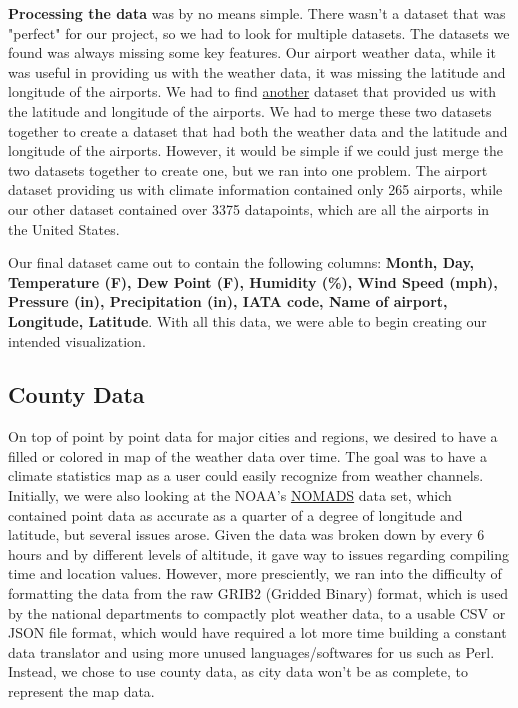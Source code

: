 \documentclass[9pt,twocolumn,twoside]{opticajnl}
\begin{document}
\textbf{Processing the data} was by no means simple. There wasn't a dataset that was "perfect" for our project, so we had to look for multiple datasets. The datasets we found was always missing some key features. Our airport weather data, while it was useful in providing us with the weather data, it was missing the latitude and longitude of the airports. We had to find \href{https://www.kaggle.com/datasets/nancyalaswad90/us-airports}{another} dataset that provided us with the latitude and longitude of the airports. We had to merge these two datasets together to create a dataset that had both the weather data and the latitude and longitude of the airports. However, it would be simple if we could just merge the two datasets together to create one, but we ran into one problem. The airport dataset providing us with climate information contained only 265 airports, while our other dataset contained over 3375 datapoints, which are all the airports in the United States.

Our final dataset came out to contain the following columns: \textbf{Month, Day, Temperature (F), Dew Point (F), Humidity (\%), Wind Speed (mph), Pressure (in), Precipitation (in), IATA code, Name of airport, Longitude, Latitude}. With all this data, we were able to begin creating our intended visualization.

\subsection{County Data}

On top of point by point data for major cities and regions, we desired to have a filled or colored in map of the weather data over time. The goal was to have a climate statistics map as a user could easily recognize from weather channels. Initially, we were also looking at the NOAA's \href{https://nomads.ncep.noaa.gov/}{NOMADS} data set, which contained point data as accurate as a quarter of a degree of longitude and latitude, but several issues arose. Given the data was broken down by every 6 hours and by different levels of altitude, it gave way to issues regarding compiling time and location values. However, more presciently, we ran into the difficulty of formatting the data from the raw GRIB2 (Gridded Binary) format, which is used by the national departments to compactly plot weather data, to a usable CSV or JSON file format, which would have required a lot more time building a constant data translator and using more unused languages/softwares for us such as Perl. Instead, we chose to use county data, as city data won't be as complete, to represent the map data.
\end{document}
